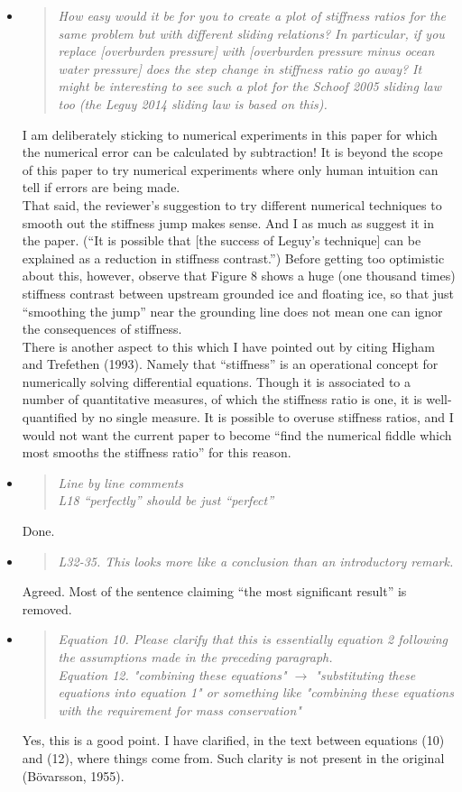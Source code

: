 \documentclass[11pt,reqno]{amsart}
\renewcommand{\dh}{\fontencoding{T1}\selectfont{\symbol{240}}}
\newcommand{\citepbod}{(B\"o\dh varsson, 1955)\xspace}
\newcommand{\reply}[2]{
\medskip\medskip
\item  \begin{quote}
\emph{#1}
\end{quote}

\medskip
\noindent #2}
\begin{document}
\begin{itemize}
\reply{How easy would it be for you to create a plot of stiffness ratios for the same problem but with different sliding relations? In particular, if you replace [overburden pressure] with [overburden pressure minus ocean water pressure] does the step change in stiffness ratio go away? It might be interesting to see such a plot for the Schoof 2005 sliding law too (the Leguy 2014 sliding law is based on this).}
{I am deliberately sticking to numerical experiments in this paper for which the numerical error can be calculated by subtraction!  It is beyond the scope of this paper to try numerical experiments where only human intuition can tell if errors are being made. \medskip \\
That said, the reviewer's suggestion to try different numerical techniques to smooth out the stiffness jump makes sense.  And I as much as suggest it in the paper.  (``It is possible that [the success of Leguy's technique] can be explained as a reduction in stiffness contrast.'')  Before getting too optimistic about this, however, observe that Figure 8 shows a huge (one thousand times) stiffness contrast between upstream grounded ice and floating ice, so that just ``smoothing the jump'' near the grounding line does not mean one can ignor the consequences of stiffness. \medskip \\
There is another aspect to this which I have pointed out by citing Higham and Trefethen (1993).  Namely that ``stiffness'' is an operational concept for numerically solving differential equations.  Though it is associated to a number of quantitative measures, of which the stiffness ratio is one, it is well-quantified by no single measure.  It is possible to overuse stiffness ratios, and I would not want the current paper to become ``find the numerical fiddle which most smooths the stiffness ratio'' for this reason.}

\reply{Line by line comments \smallskip \\
L18 ``perfectly'' should be just ``perfect''}
{Done.}

\reply{L32-35. This looks more like a conclusion than an introductory remark.}
{Agreed.  Most of the sentence claiming ``the most significant result'' is removed.}

\reply{Equation 10. Please clarify that this is essentially equation 2 following the assumptions made in the preceding paragraph. \smallskip \\
Equation 12. "combining these equations" $\to$ "substituting these equations into equation 1" or something like "combining these equations with the requirement for mass conservation"}
{Yes, this is a good point.  I have clarified, in the text between equations (10) and (12), where things come from.  Such clarity is not present in the original \citepbod.}


\end{itemize}
\end{document}
